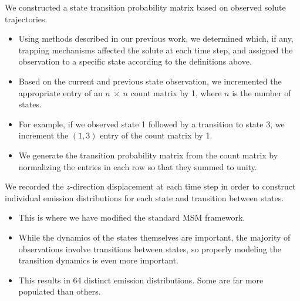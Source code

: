 \documentclass{article}
\begin{document}
  
  \noindent We constructed a state transition probability matrix based on observed solute
  trajectories.
  \begin{itemize}
    \item Using methods described in our previous work, we determined 	
    which, if any, trapping mechanisms affected the solute at each time step, and
    assigned the observation to a specific state according to the definitions 
    above.~\cite{coscia_chemically_2019}
    \item Based on the current and previous state observation, we incremented the
    appropriate entry of an $n~\times~n$ count matrix by 1, where $n$ is the number of states.
    \item For example, if we observed state 1 followed by a transition to state 3,
    we increment the $(1, 3)$ entry of the count matrix by 1.
    \item We generate the transition probability matrix from the count matrix by 
    normalizing the entries in each row so that they summed to unity.
  \end{itemize}
  
  \noindent We recorded the $z$-direction displacement at each time step in order to construct
  individual emission distributions for each state and transition between states.
  \begin{itemize}
    \item This is where we have modified the standard MSM framework.
    \item While the dynamics of the states themselves are important, the 
    majority of observations involve transitions between states, so properly modeling
    the transition dynamics is even more important.
    \item This results in 64 distinct emission distributions. Some are far more
    populated than others. %
  \end{itemize}
\end{document}
